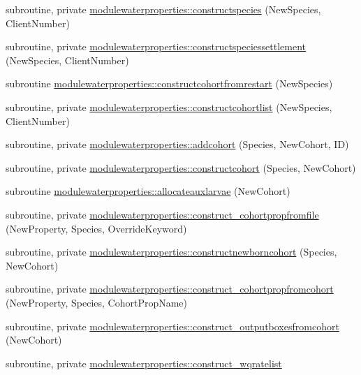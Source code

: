 \begin{DoxyCompactItemize}
\item 
subroutine, private \mbox{\hyperlink{namespacemodulewaterproperties_a34a1aa06efecd62c35348355c7bab36e}{modulewaterproperties\+::constructspecies}} (New\+Species, Client\+Number)
\item 
subroutine, private \mbox{\hyperlink{namespacemodulewaterproperties_a3d2b79958b73c28e20d23afd2fe092ef}{modulewaterproperties\+::constructspeciessettlement}} (New\+Species, Client\+Number)
\item 
subroutine \mbox{\hyperlink{namespacemodulewaterproperties_a1c0b4f7abb2ee1226f22838efe265c80}{modulewaterproperties\+::constructcohortfromrestart}} (New\+Species)
\item 
subroutine, private \mbox{\hyperlink{namespacemodulewaterproperties_abc72b5ed3f87133ad8c1dfd787c6eee5}{modulewaterproperties\+::constructcohortlist}} (New\+Species, Client\+Number)
\item 
subroutine, private \mbox{\hyperlink{namespacemodulewaterproperties_a2a206e94af2b9f46781896fdc7ccfb3a}{modulewaterproperties\+::addcohort}} (Species, New\+Cohort, ID)
\item 
subroutine, private \mbox{\hyperlink{namespacemodulewaterproperties_ae8f037a58e95e5182b8c0d4b073ad271}{modulewaterproperties\+::constructcohort}} (Species, New\+Cohort)
\item 
subroutine \mbox{\hyperlink{namespacemodulewaterproperties_a7cc00cb7efcee6190d254a8eb846064c}{modulewaterproperties\+::allocateauxlarvae}} (New\+Cohort)
\item 
subroutine, private \mbox{\hyperlink{namespacemodulewaterproperties_ad9060a1bd0766835e26c1961f52d84a0}{modulewaterproperties\+::construct\+\_\+cohortpropfromfile}} (New\+Property, Species, Override\+Keyword)
\item 
subroutine, private \mbox{\hyperlink{namespacemodulewaterproperties_a6d6a2e31ca36bd79bebb89f3613ed278}{modulewaterproperties\+::constructnewborncohort}} (Species, New\+Cohort)
\item 
subroutine, private \mbox{\hyperlink{namespacemodulewaterproperties_ae1c5c0deae03ce719a2b777bc86fb00f}{modulewaterproperties\+::construct\+\_\+cohortpropfromcohort}} (New\+Property, Species, Cohort\+Prop\+Name)
\item 
subroutine, private \mbox{\hyperlink{namespacemodulewaterproperties_a6f39106e418f143aa0c8fc86f0756562}{modulewaterproperties\+::construct\+\_\+outputboxesfromcohort}} (New\+Cohort)
\item 
subroutine, private \mbox{\hyperlink{namespacemodulewaterproperties_abadbafe8dee3212a744771417b0c292a}{modulewaterproperties\+::construct\+\_\+wqratelist}}

\end{DoxyCompactItemize}

